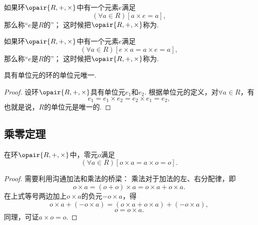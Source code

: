 \begin{definition}
如果环\(\opair{R,+,\times}\)中有一个元素\(e\)满足\begin{equation*}
	(\forall a \in R)[a \times e = a],
\end{equation*}
那么称“\(e\)是\(R\)的”；
这时候把\(\opair{R,+,\times}\)称为.
\end{definition}

\begin{definition}
如果环\(\opair{R,+,\times}\)中有一个元素\(e\)满足\begin{equation*}
	(\forall a \in R)[e \times a = a \times e = a],
\end{equation*}
那么称“\(e\)是\(R\)的”；
这时候把\(\opair{R,+,\times}\)称为.
\end{definition}

\begin{property}
具有单位元的环的单位元唯一.
\begin{proof}
设环\(\opair{R,+,\times}\)具有单位元\(e_1\)和\(e_2\).
根据单位元的定义，对\(\forall a \in R\)，有\begin{equation*}
	e_1 = e_1 \times e_2 = e_2 \times e_1 = e_2,
\end{equation*}
也就是说，\(R\)的单位元是唯一的.
\end{proof}
\end{property}

\subsection{乘零定理}
\begin{theorem}[乘零定理]
在环\(\opair{R,+,\times}\)中，零元\(o\)满足\begin{equation*}
	(\forall a \in R)[o \times a = a \times o = o].
\end{equation*}
\begin{proof}
需要利用沟通加法和乘法的桥梁：
乘法对于加法的左、右分配律，即\begin{equation*}
	o \times a = (o + o) \times a = o \times a + o \times a.
\end{equation*}在上式等号两边加上\(o \times a\)的负元\(-o \times a\)，得\begin{equation*}
	o \times a + (- o \times a) = (o \times a + o \times a) + (- o \times a),
\end{equation*}\begin{equation*}
	o = o \times a.
\end{equation*}
同理，可证\(a \times o = o\).
\end{proof}
\end{theorem}

